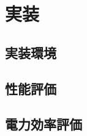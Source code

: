 \chapter{実装}
{
\label{chap:implement}

\section{実装環境}
\label{sec:impl_env}

\section{性能評価}
\label{sec:measure}

\section{電力効率評価}
\label{sec:measure}
}